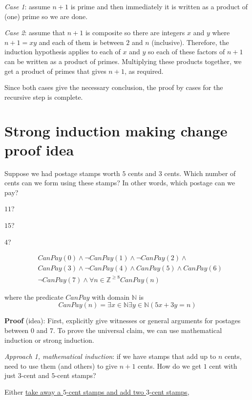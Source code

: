 \documentclass[12pt, oneside]{article}
\begin{document}
{\it Case 1}: assume $n+1$ is prime and then immediately it is written as a product
of (one) prime so we are done.  

{\it Case 2}: assume that $n+1$ is composite
so there are integers $x$ and $y$ where $n+1 = xy$ and each of them is between $2$ and $n$
(inclusive).  Therefore, the induction hypothesis applies to each of $x$ and $y$ so each 
of these factors of $n+1$ can be written as a product of primes.  Multiplying these products together, 
we get a product of primes that gives $n+1$, as required. 

Since both cases give the necessary
conclusion, the proof by cases for the recursive step is complete. \vfill
\section*{Strong induction making change proof idea}


Suppose we had postage stamps worth $5$ cents and $3$ cents.
Which number of cents can we form using these stamps?
In other words, which postage can we pay?

$11$? 

$15$? 


$4$?



\begin{align*}
    &CanPay(0) \land \lnot CanPay(1) \land \lnot CanPay(2) \land \\
    &CanPay(3) \land \lnot CanPay(4) \land CanPay(5) \land CanPay(6) \\
    &\lnot CanPay(7) \land \forall n \in \mathbb{Z}^{\geq 8} CanPay(n)
\end{align*}

where the predicate $CanPay$ with domain $\mathbb{N}$ is
\[
    CanPay(n) = \exists x \in \mathbb{N} \exists y \in \mathbb{N}  ( 5x+3y = n)
\]


{\bf Proof} (idea): First, explicitly give witnesses or general arguments
for postages between $0$ and $7$. 
To prove the universal claim, we can use mathematical induction or strong induction.

{\it Approach 1, mathematical induction}: if we have
stamps that add up to $n$ cents, need to use them (and others)
to give $n+1$ cents. How do we get $1$ cent with just $3$-cent
and $5$-cent stamps?

\vspace{-10pt}
Either \underline{take away a $5$-cent stamps and add two $3$-cent stamps},
\end{document}
